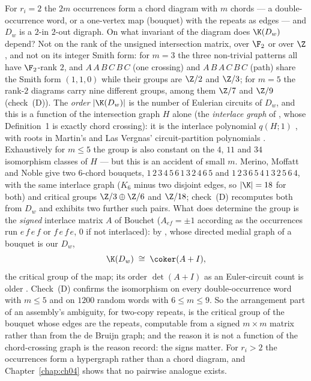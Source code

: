 \begin{remark}\label{ch03:rem:chord}
For $r_i=2$ the $2m$ occurrences form a chord diagram with $m$ chords --- a
double-occurrence word, or a one-vertex map (bouquet) with the repeats as edges --- and
$D_w$ is a $2$-in $2$-out digraph. On what invariant of the diagram does $\K(D_w)$
depend? Not on the rank of the unsigned intersection matrix, over $\F_2$ or over $\Z$,
and not on its integer Smith form: for $m=3$ the three non-trivial patterns all have
$\F_2$-rank $2$, and $A\,A\,B\,C\,B\,C$ (one crossing) and $A\,B\,A\,C\,B\,C$ (path)
share the Smith form $(1,1,0)$ while their groups are $\Z/2$ and $\Z/3$; for $m=5$ the
rank-$2$ diagrams carry nine different groups, among them $\Z/7$ and $\Z/9$
(check~(D)). The \emph{order} $|\K(D_w)|$ is the number of Eulerian circuits of $D_w$,
and this is a function of the intersection graph $H$ alone (the \emph{interlace graph}
of \cite{ABS}, whose Definition~1 is exactly chord crossing): it is the interlace
polynomial $q(H;1)$ \cite[Thm.~9, Cor.~13]{ABS}, with roots in Martin's and Las Vergnas'
circuit-partition polynomials \cite{LasVergnas}. Exhaustively for $m\le5$ the group is
also constant on the $4$, $11$ and $34$ isomorphism classes of $H$ --- but this is an
accident of small $m$. Merino, Moffatt and Noble \cite[Rem.~6.7]{MMN} give two
$6$-chord bouquets, $1\,2\,3\,4\,5\,6\,1\,3\,2\,4\,6\,5$ and
$1\,2\,3\,6\,5\,4\,1\,3\,2\,5\,6\,4$, with the same interlace graph ($K_6$ minus two
disjoint edges, so $|\K|=18$ for both) and critical groups $\Z/3\oplus\Z/6$ and
$\Z/18$; check~(D) recomputes both from $D_w$ and exhibits two further such pairs. What
does determine the group is the \emph{signed} interlace matrix $A$ of Bouchet
($A_{ef}=\pm1$ according as the occurrences run $e\,f\,e\,f$ or $f\,e\,f\,e$, $0$ if
not interlaced): by \cite[Thm.~7.3]{MMN}, whose directed medial graph of a bouquet is
our $D_w$,
\[
\K(D_w)\;\cong\;\coker(A+I),
\]
the critical group of the map; its order $\det(A+I)$ as an Euler-circuit count is older
\cite{MacrisPule,Jonsson}. Check~(D) confirms the isomorphism on every double-occurrence
word with $m\le5$ and on $1200$ random words with $6\le m\le9$. So the arrangement part
of an assembly's ambiguity, for two-copy repeats, is the critical group of the bouquet
whose edges are the repeats, computable from a signed $m\times m$ matrix rather than
from the de Bruijn graph; and the reason it is not a function of the chord-crossing
graph is the reason \cite{MMN} record: the signs matter. For $r_i>2$ the occurrences
form a hypergraph rather than a chord diagram, and Chapter~\ref{chap:ch04} shows that no pairwise
analogue exists.
\end{remark}

